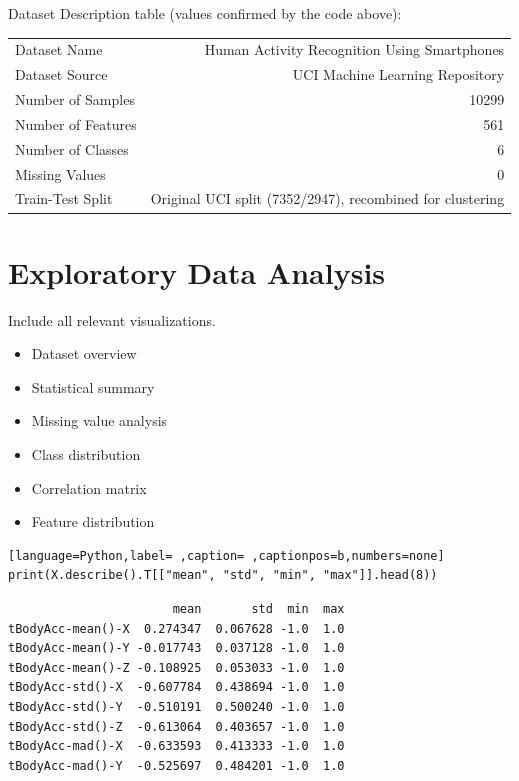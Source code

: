 \documentclass[12pt,a4paper]{article}
\begin{document}
Dataset Description table (values confirmed by the code above):

\begin{center}
\begin{tabular}{lr}
\hline
Dataset Name & Human Activity Recognition Using Smartphones\\[0pt]
Dataset Source & UCI Machine Learning Repository\\[0pt]
Number of Samples & 10299\\[0pt]
Number of Features & 561\\[0pt]
Number of Classes & 6\\[0pt]
Missing Values & 0\\[0pt]
Train-Test Split & Original UCI split (7352/2947), recombined for clustering\\[0pt]
\hline
\end{tabular}
\end{center}

\section{Exploratory Data Analysis}
\label{sec:orgcc9e3f2}

Include all relevant visualizations.
\begin{itemize}
\item Dataset overview
\item Statistical summary
\item Missing value analysis
\item Class distribution
\item Correlation matrix
\item Feature distribution
\end{itemize}

\begin{lstlisting}[language=Python,label= ,caption= ,captionpos=b,numbers=none]
print(X.describe().T[["mean", "std", "min", "max"]].head(8))
\end{lstlisting}

\begin{verbatim}
                       mean       std  min  max
tBodyAcc-mean()-X  0.274347  0.067628 -1.0  1.0
tBodyAcc-mean()-Y -0.017743  0.037128 -1.0  1.0
tBodyAcc-mean()-Z -0.108925  0.053033 -1.0  1.0
tBodyAcc-std()-X  -0.607784  0.438694 -1.0  1.0
tBodyAcc-std()-Y  -0.510191  0.500240 -1.0  1.0
tBodyAcc-std()-Z  -0.613064  0.403657 -1.0  1.0
tBodyAcc-mad()-X  -0.633593  0.413333 -1.0  1.0
tBodyAcc-mad()-Y  -0.525697  0.484201 -1.0  1.0
\end{verbatim}
\end{document}
